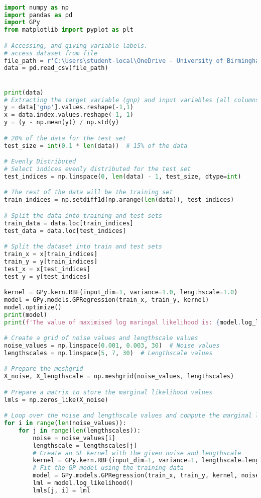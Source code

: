 \documentclass[12pt,a4paper]{article}
\begin{document}
\begin{lstlisting}[language=python, caption={Code of the Creation of Figure \ref{fig:LML contour Orange County plot}}]

import numpy as np
import pandas as pd
import GPy
from matplotlib import pyplot as plt

# Accessing, and giving variable labels.
# access dataset from file
file_path = r'C:\Users\student-local\OneDrive - University of Birmingham\Dissertation\OrangeCounty.csv'
data = pd.read_csv(file_path)


print(data)
# Extracting the target variable (gnp) and input variables (all columns except 'gnp')
y = data['gnp'].values.reshape(-1,1)
x = data.index.values.reshape(-1, 1)
y = (y - np.mean(y)) / np.std(y)

# 20% of the data for the test set
test_size = int(0.1 * len(data))  # 15% of the data

# Evenly Distributed
# Select indices evenly distributed for the test set
test_indices = np.linspace(0, len(data) - 1, test_size, dtype=int)

# The rest of the data will be the training set
train_indices = np.setdiff1d(np.arange(len(data)), test_indices)

# Split the data into training and test sets
train_data = data.loc[train_indices]
test_data = data.loc[test_indices]

# Split the dataset into train and test sets
train_x = x[train_indices]  
train_y = y[train_indices]  
test_x = x[test_indices]    
test_y = y[test_indices]

kernel = GPy.kern.RBF(input_dim=1, variance=1.0, lengthscale=1.0)
model = GPy.models.GPRegression(train_x, train_y, kernel)
model.optimize()
print(model)
print(f'The value of maximised log maringal likelihood is: {model.log_likelihood()}')

# Create a grid of noise values and lengthscale values
noise_values = np.linspace(0.001, 0.003, 30)  # Noise values
lengthscales = np.linspace(5, 7, 30)  # Lengthscale values

# Prepare the meshgrid
X_noise, X_lengthscale = np.meshgrid(noise_values, lengthscales)

# Prepare a matrix to store the marginal likelihood values
lmls = np.zeros_like(X_noise)

# Loop over the noise and lengthscale values and compute the marginal likelihood
for i in range(len(noise_values)):
    for j in range(len(lengthscales)):
        noise = noise_values[i]
        lengthscale = lengthscales[j]
        # Create an SE kernel with the given noise and lengthscale
        kernel = GPy.kern.RBF(input_dim=1, variance=1, lengthscale=lengthscale)
        # Fit the GP model using the training data
        model = GPy.models.GPRegression(train_x, train_y, kernel, noise_var=noise)
        lml = model.log_likelihood()
        lmls[j, i] = lml
        

\end{lstlisting}
\end{document}
